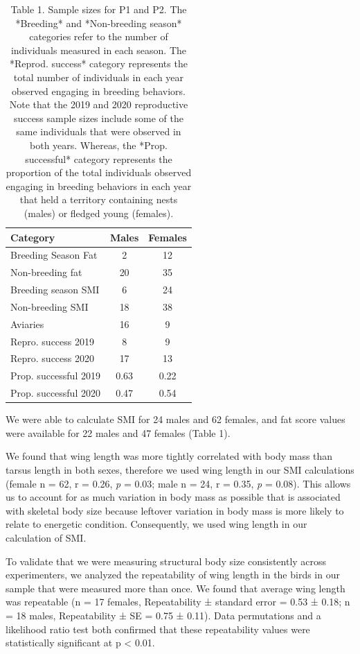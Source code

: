 \documentclass[
]{article}
\begin{document}
\begin{table}

\caption{\label{tab:sample size table}Table 1. Sample sizes for P1 and P2.  The *Breeding* and *Non-breeding season* categories refer to the number of individuals measured in each season. The *Reprod. success* category represents the total number of individuals in each year observed engaging in breeding behaviors. Note that the 2019 and 2020 reproductive success sample sizes include some of the same individuals that were observed in both years. Whereas, the *Prop. successful* category represents the proportion of the total individuals observed engaging in breeding behaviors in each year that held a territory containing nests (males) or fledged young (females).}
\centering
\begin{tabular}[t]{lcc}
\toprule
Category & Males & Females\\
\midrule
Breeding Season Fat & 2 & 12\\
Non-breeding fat & 20 & 35\\
Breeding season SMI & 6 & 24\\
Non-breeding SMI & 18 & 38\\
Aviaries & 16 & 9\\
\addlinespace
Repro. success 2019 & 8 & 9\\
Repro. success 2020 & 17 & 13\\
Prop. successful 2019 & 0.63 & 0.22\\
Prop. successful 2020 & 0.47 & 0.54\\
\bottomrule
\end{tabular}
\end{table}

We were able to calculate SMI for 24 males and 62 females, and fat score
values were available for 22 males and 47 females (Table 1).

We found that wing length was more tightly correlated with body mass
than tarsus length in both sexes, therefore we used wing length in our
SMI calculations (female n = 62, r = 0.26, \emph{p} = 0.03; male n = 24,
r = 0.35, \emph{p} = 0.08). This allows us to account for as much
variation in body mass as possible that is associated with skeletal body
size because leftover variation in body mass is more likely to relate to
energetic condition. Consequently, we used wing length in our
calculation of SMI.

To validate that we were measuring structural body size consistently
across experimenters, we analyzed the repeatability of wing length in
the birds in our sample that were measured more than once. We found that
average wing length was repeatable (n = 17 females, Repeatability ±
standard error = 0.53 ± 0.18; n = 18 males, Repeatability ± SE = 0.75 ±
0.11). Data permutations and a likelihood ratio test both confirmed that
these repeatability values were statistically significant at p
\textless{} 0.01.
\end{document}
